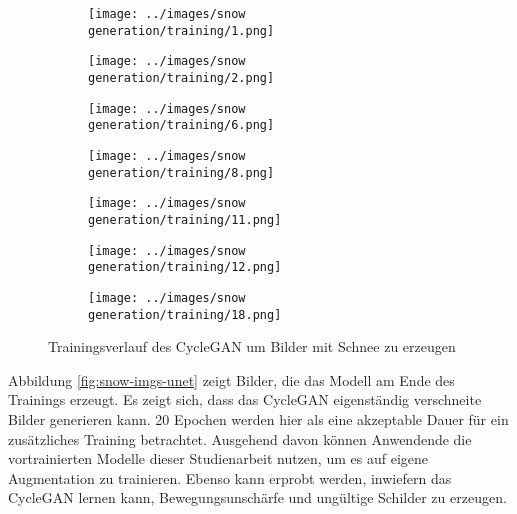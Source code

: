 \begin{figure}[H]
	\centering
  \captionsetup[subfigure]{labelformat=empty}
	\begin{subfigure}[b]{0.125\textwidth}
		 \centering
		 \texttt{[image: ../images/snow generation/training/1.png]}
	\end{subfigure}
	\hspace{0.5em}%
	\begin{subfigure}[b]{0.125\textwidth}
		 \centering
		 \texttt{[image: ../images/snow generation/training/2.png]}
	\end{subfigure}
	\hspace{0.5em}%
	\begin{subfigure}[b]{0.125\textwidth}
		 \centering
		 \texttt{[image: ../images/snow generation/training/6.png]}
	\end{subfigure}
	\hspace{0.5em}%
	\begin{subfigure}[b]{0.125\textwidth}
	 \centering
	 \texttt{[image: ../images/snow generation/training/8.png]}
  \end{subfigure}
  \hspace{0.5em}%
  \begin{subfigure}[b]{0.125\textwidth}
	\centering
	\texttt{[image: ../images/snow generation/training/11.png]}
	\end{subfigure}
	\hspace{0.5em}%
	\begin{subfigure}[b]{0.125\textwidth}
		\centering
		\texttt{[image: ../images/snow generation/training/12.png]}
	\end{subfigure}
	\hspace{0.5em}%
	\begin{subfigure}[b]{0.125\textwidth}
		\centering
		\texttt{[image: ../images/snow generation/training/18.png]}
	\end{subfigure}
 \caption{Trainingsverlauf des \ac{CycleGAN} um Bilder mit Schnee zu erzeugen}
 \label{fig:snow-imgs-training}
 \end{figure}

Abbildung \ref{fig:snow-imgs-unet} zeigt Bilder, die das Modell am Ende des Trainings erzeugt. Es zeigt sich, dass das \ac{CycleGAN} eigenständig verschneite Bilder generieren kann. 20 Epochen werden hier als eine akzeptable Dauer für ein zusätzliches Training betrachtet. Ausgehend davon können Anwendende die vortrainierten Modelle dieser Studienarbeit nutzen, um es auf eigene Augmentation zu trainieren. Ebenso kann erprobt werden, inwiefern das \ac{CycleGAN} lernen kann, Bewegungsunschärfe und ungültige Schilder zu erzeugen.
 
